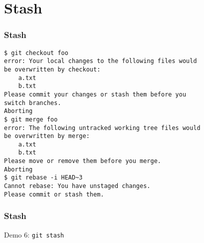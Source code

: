 \section[Section]{Stash}

\begin{frame}[fragile]
    \frametitle{Stash}
    \small
    \begin{verbatim}
$ git checkout foo
error: Your local changes to the following files would
be overwritten by checkout:
    a.txt
    b.txt
Please commit your changes or stash them before you
switch branches.
Aborting
$ git merge foo
error: The following untracked working tree files would
be overwritten by merge:
    a.txt
    b.txt
Please move or remove them before you merge.
Aborting
$ git rebase -i HEAD~3
Cannot rebase: You have unstaged changes.
Please commit or stash them.
    \end{verbatim}
\end{frame}

\begin{frame}
    \frametitle{Stash}
    \alert{Demo 6}: \texttt{git stash}
\end{frame}
